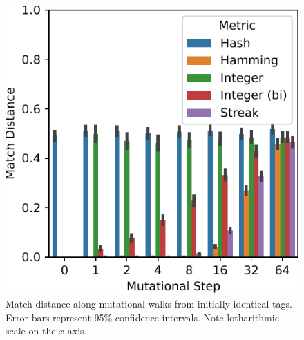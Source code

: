 \begin{figure}
\begin{center}

\includegraphics[width=\textwidth]{img/mutational_walk/bitweight=0dot5+seed=1+title=mutational_walk_barplot+_data_hathash_hash=8bf152d87daa9cb7+_script_fullcat_hash=44da7637259f16b6+ext=}
\caption{
Match distance along mutational walks from initially identical tags.
Error bars represent 95\% confidence intervals.
Note lotharithmic scale on the $x$ axis.
}
\label{fig:mutational_walk_barplot}

\end{center}
\end{figure}
